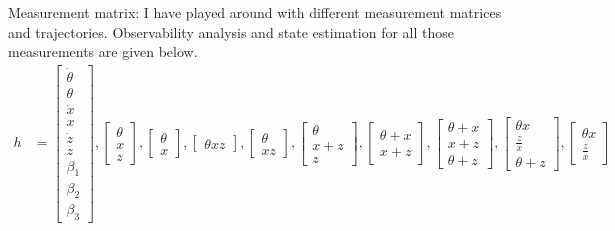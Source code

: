 \documentclass[12pt]{article}
\begin{document}
Measurement matrix: I have played around with different measurement matrices and trajectories. Observability analysis and state estimation for all those measurements are given below.
\begin{align*}
    h &= \left[\begin{matrix}\dot{\theta}\\\theta\\\dot{x}\\x\\\dot{z}\\z\\\beta_{1}\\\beta_{2}\\\beta_{3}\end{matrix}\right], 
    \left[\begin{matrix}\theta\\x\\z\end{matrix}\right],
    \left[\begin{matrix}\theta\\x\end{matrix}\right], 
    \left[\begin{matrix}\theta x z\end{matrix}\right], 
    \left[\begin{matrix}\theta\\x z\end{matrix}\right],
    \left[\begin{matrix}\theta\\x + z\\z\end{matrix}\right],
    \left[\begin{matrix}\theta + x\\x + z\end{matrix}\right],
    \left[\begin{matrix}\theta + x\\x + z\\\theta + z\end{matrix}\right],
    \left[\begin{matrix}\theta x\\\frac{z}{x}\\\theta + z\end{matrix}\right],
    \left[\begin{matrix}\theta x\\\frac{z}{x}\end{matrix}\right]
\end{align*}
\end{document}
